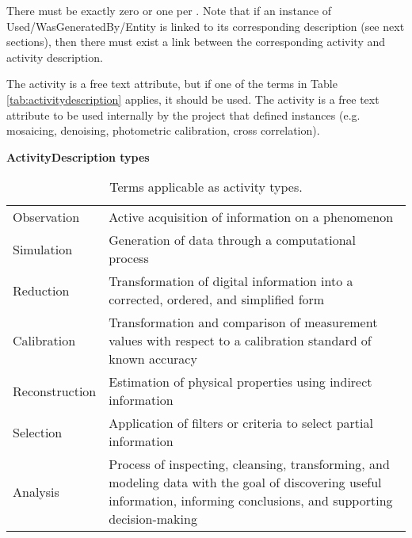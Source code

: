 There must be exactly zero or one  per . 
Note that if an instance of Used/WasGeneratedBy/Entity is linked to its corresponding description (see next sections), then there must exist a link between the corresponding activity and activity description.

The activity  is a free text attribute, but if one of the terms in Table \ref{tab:activitydescription} applies, it should be used.
The activity  is a free text attribute to be used internally by the project that defined  instances (e.g. mosaicing, denoising, photometric calibration, cross correlation).




\begin{table}[ht]
\small
{}\textwidth
\textbf{\normalsize ActivityDescription types}\vspace{0.25em}\\
\begin{tabulary}{1.0\textwidth}{lL}
\toprule
{} &  \\
\midrule
Observation    & Active acquisition of information on a phenomenon\\
Simulation     & Generation of data through a computational process\\
Reduction      & Transformation of digital information into a corrected, ordered, and simplified form\\
Calibration    & Transformation and comparison of measurement values with respect to a calibration standard of known accuracy\\
Reconstruction & Estimation of physical properties using indirect information\\
Selection      & Application of filters or criteria to select partial information\\
Analysis       & Process of inspecting, cleansing, transforming, and modeling data with the goal of discovering useful information, informing conclusions, and supporting decision-making\\
\bottomrule
\end{tabulary}
\caption[Terms applicable as activity types.]{Terms applicable as activity types.}
\label{tab:activitydescription-roles}
\end{table}




